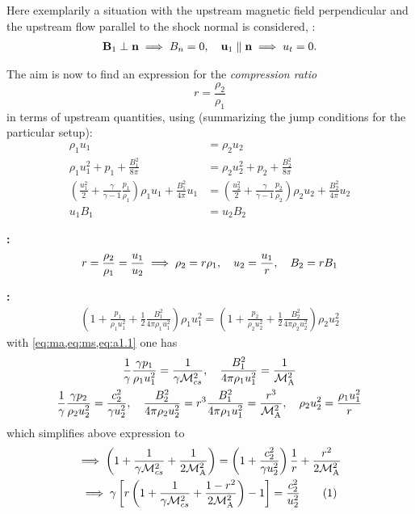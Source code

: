 Here exemplarily a situation with the upstream magnetic field perpendicular
and the upstream flow parallel to the shock normal is considered, \ie:
\begin{gather*}
    \vec{B}_1\perp\vec{n}\implies B_n=0 \qc
    \vec{u}_1\parallel\vec{n}\implies u_t=0.
\end{gather*}

The aim is now to find an expression for the \emph{compression ratio}
\begin{equation}
    r=\frac{\rho_2}{\rho_1}
    \label{eq:r}
\end{equation}
in terms of upstream quantities, using (summarizing the jump conditions for
the particular setup):%
\begin{subequations}
\begin{align}
    \rho_1 u_1&=\rho_2 u_2 \label{eq:a1} \\
    \rho_1 u_1^2+p_1+\frac{B_1^2}{8\pi}&=\rho_2
    u_2^2+p_2+\frac{B_2^2}{8\pi} \label{eq:a2} \\
    \left(\frac{u_1^2}{2}+\frac{\gamma}{\gamma-1}\frac{p_1}{\rho_1}\right)\rho_1u_1+\frac{B_1^2}{4\pi}u_1
    &=\left(\frac{u_2^2}{2}+\frac{\gamma}{\gamma-1}\frac{p_2}{\rho_2}\right)\rho_2u_2+\frac{B_2^2}{4\pi}u_2
    \label{eq:a3} \\
    u_1B_1&=u_2B_2 \label{eq:a4}
\end{align}
\end{subequations}

\textbf{:}
\begin{equation}
    r=\frac{\rho_2}{\rho_1}=\frac{u_1}{u_2}
    \implies\rho_2=r\rho_1\qc u_2=\frac{u_1}{r}\qc B_2=r B_1
    \label{eq:a1.1}
\end{equation}

\textbf{:}
\begin{gather*}
    \left(1+\frac{p_1}{\rho_1u_1^2}+\frac{1}{2}\frac{B_1^2}{4\pi\rho_1u_1^2}\right)\rho_1u_1^2=
    \left(1+\frac{p_2}{\rho_2u_2^2}+\frac{1}{2}\frac{B_2^2}{4\pi\rho_2u_2^2}\right)\rho_2u_2^2
\end{gather*}
with \cref{eq:ma,eq:ms,eq:a1.1} one has
\begin{gather*}
    \frac{1}{\gamma}\frac{\gamma{p_1}}{\rho_1u_1^2}=\frac{1}{\gamma\Mcsq}\qc
    \frac{B_1^2}{4\pi\rho_1u_1^2}=\frac{1}{\MAsq}\\
    \frac{1}{\gamma}\frac{\gamma{p_2}}{\rho_2u_2^2}=\frac{c_2^2}{\gamma{u_2^2}}\qc
    \frac{B_2^2}{4\pi\rho_2u_2^2}=r^3\frac{B_1^2}{4\pi\rho_1u_1^2}=\frac{r^3}{\MAsq}\qc
    \rho_2u_2^2=\frac{\rho_1u_1^2}{r}
\end{gather*}
which simplifies above expression to
\begin{gather*}
    \implies
    \left(1+\frac{1}{\gamma\Mcsq}+\frac{1}{2\MAsq}\right)
    =\left(1+\frac{c_2^2}{\gamma{u_2^2}}\right)\frac{1}{r}+\frac{r^2}{2\MAsq}
    \\ \implies
    \gamma\left[r\left(1+\frac{1}{\gamma\Mcsq}+\frac{1-r^2}{2\MAsq}\right)-1\right]=\frac{c_2^2}{u_2^2}
    \numberthis\label{eq:a2.1}
\end{gather*}

